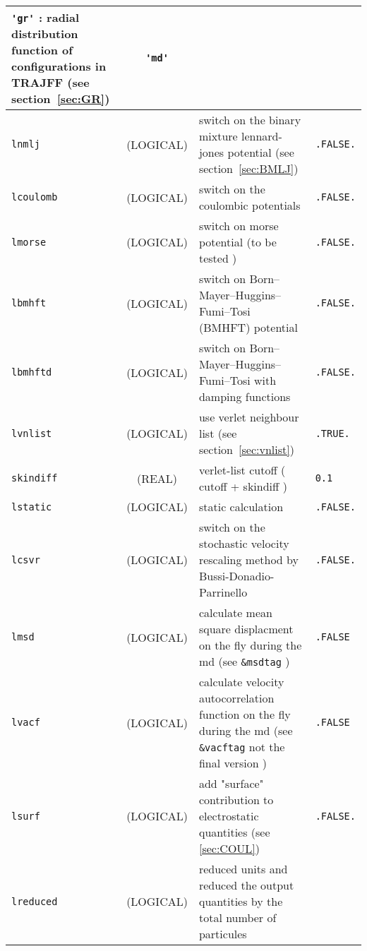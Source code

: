 \documentclass[a4paper,8pt]{article}
\begin{document}
\begin{longtable}{l|c|m{8cm}|m{2cm}}
					\verb?'gr'? : radial distribution function of configurations in TRAJFF
					(see section~\ref{sec:GR}) \newline                                                 & \verb?'md'?   \tabularnewline
\hline
\rule[-0.75cm]{0cm}{1.5cm}
\verb?lnmlj?     & (LOGICAL)          &  switch on the binary mixture lennard-jones potential (see section~\ref{sec:BMLJ})  & \verb?.FALSE.?  \\
\hline
\rule[-0.75cm]{0cm}{1.5cm}
\verb?lcoulomb?  & (LOGICAL)          &  switch on the coulombic potentials                                                 & \verb?.FALSE.? \\
\hline
\rule[-0.75cm]{0cm}{1.5cm}
\verb?lmorse?    & (LOGICAL)          &  switch on morse potential (to be tested )                                          & \verb?.FALSE.? \\
\hline
\rule[-0.75cm]{0cm}{1.5cm}
\verb?lbmhft?    & (LOGICAL)          &  switch on Born–Mayer–Huggins–Fumi–Tosi (BMHFT) potential                           & \verb?.FALSE.? \\
\hline
\rule[-0.75cm]{0cm}{1.5cm}
\verb?lbmhftd?   & (LOGICAL)          &  switch on Born–Mayer–Huggins–Fumi–Tosi  with damping functions                     & \verb?.FALSE.? \\
\hline
\rule[-0.75cm]{0cm}{1.5cm}
\verb?lvnlist?   & (LOGICAL)          &  use verlet neighbour list (see section~\ref{sec:vnlist})                           & \verb?.TRUE.?  \\
\hline
\rule[-0.75cm]{0cm}{1.5cm}
\verb?skindiff?  
                 & (REAL)             &  verlet-list cutoff ( cutoff + skindiff )                                           & \verb?0.1?\\
\hline
\rule[-0.75cm]{0cm}{1.5cm}
\verb?lstatic?   & (LOGICAL)          &  static calculation                                                                 & \verb?.FALSE.? \\
\hline
\rule[-0.75cm]{0cm}{1.5cm}
\verb?lcsvr?   & (LOGICAL)            &  switch on the stochastic velocity rescaling method by Bussi-Donadio-Parrinello     & \verb?.FALSE.? \\
\hline
\rule[-0.75cm]{0cm}{1.5cm}
\verb?lmsd?      & (LOGICAL)          & calculate mean square displacment on the fly during the md (see \verb?&msdtag? )    & \verb?.FALSE? \\
\hline
\rule[-0.75cm]{0cm}{1.5cm}
\verb?lvacf?     & (LOGICAL)          & calculate velocity autocorrelation function on the fly during the md 
                                        (see \verb?&vacftag? not the final version )                                        & \verb?.FALSE? \\
\hline
\rule[-0.75cm]{0cm}{1.5cm}
\verb?lsurf?     & (LOGICAL)          &  add "surface" contribution to electrostatic quantities (see \ref{sec:COUL})        & \verb?.FALSE.?  \\
\hline
\rule[-0.75cm]{0cm}{1.5cm}
\verb?lreduced?  & (LOGICAL)          &  \newline reduced units and reduced the output quantities by the 
                                         total number of particules \newline


\end{longtable}
\end{document}
